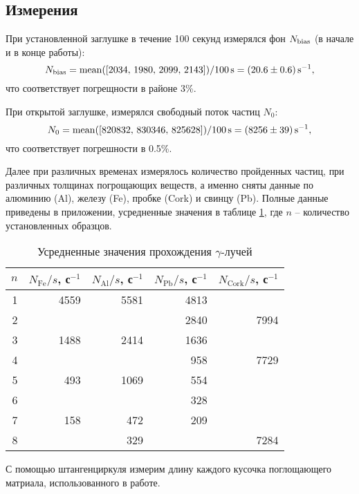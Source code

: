 \subsection*{Измерения}


При установленной заглушке в течение 100 секунд измерялся фон $N_{\textnormal{bias}}$ (в начале и в конце работы):
\begin{equation*}
    N_{\textnormal{bias}} = \mathop{\mathrm{mean}}\nolimits([2034,\,  1980,\,  2099,\,  2143])/100\, \text{s} = (20.6 \pm 0.6)\, \textnormal{s}^{-1},
\end{equation*}
что соответствует погрещности в районе 3\%. 

При открытой заглушке, измерялся свободный поток частиц $N_0$:
\begin{equation*}
    N_0 = \mathop{\mathrm{mean}}\nolimits([820832,\,  830346,\,  825628])/100\, \text{s} = (8256 \pm 39)\, \textnormal{s}^{-1},
\end{equation*}
что соответствует погрешности в 0.5\%.

Далее при различных временах измерялось количество пройденных частиц, при различных толщинах погрощающих веществ, а именно сняты данные по алюминию (Al), железу (Fe), пробке (Cork) и свинцу (Pb). Полные данные приведены в приложении, усредненные значения в таблице \ref{tab:1}, где $n$ -- количество установленных образцов.


\begin{table}[h]
    \centering
    \caption{Усредненные значения прохождения $\gamma$-лучей}
    \begin{tabular}{rrrrr}
    \toprule
     $n$ &  $N_{\text{Fe}}/s$, с$^{-1}$ &  $N_{\text{Al}}/s$, с$^{-1}$ &  $N_{\text{Pb}}/s$, с$^{-1}$ &  $N_{\text{Cork}}/s$, с$^{-1}$ \\
    \midrule
     1 &   4559 &   5581 &   4813 &          \\
     2 &        &        &   2840 &     7994 \\
     3 &   1488 &   2414 &   1636 &          \\
     4 &        &        &    958 &     7729 \\
     5 &    493 &   1069 &    554 &          \\
     6 &        &        &    328 &          \\
     7 &    158 &    472 &    209 &          \\
     8 &        &    329 &        &     7284 \\
    \bottomrule
    \end{tabular}
    \label{tab:1}
\end{table}


С помощью штангенциркуля измерим длину каждого кусочка поглощающего матриала, использованного в работе.
